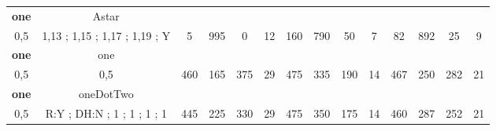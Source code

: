 \begin{table}[H]
{\begin{tabular}{|c|c|c|c|c|c|c|c|c|c|c|c|c|c|}
\cellcolor{blue!15}\textbf{one} & Astar& {\color[HTML]{00009B} } & {\color[HTML]{9A0000} } & {\color[HTML]{009901} } &  & {\color[HTML]{00009B} } & {\color[HTML]{9A0000} } & {\color[HTML]{009901} } &  & {\color[HTML]{00009B} } & {\color[HTML]{9A0000} } & {\color[HTML]{009901} } &  \\ 
\cellcolor{ blue!15}0,5 & 1,13 ; 1,15 ; 1,17 ; 1,19 ; Y & \multirow{-2}{*}{{\color[HTML]{00009B} 5}} & \multirow{-2}{*}{{\color[HTML]{9A0000} 995}} & \multirow{-2}{*}{{\color[HTML]{009901} 0}} & \multirow{-2}{*}{12} & \multirow{-2}{*}{{\color[HTML]{00009B} 160}} & \multirow{-2}{*}{{\color[HTML]{9A0000} 790}} & \multirow{-2}{*}{{\color[HTML]{009901} 50}} & \multirow{-2}{*}{7} & \multirow{-2}{*}{{\color[HTML]{00009B} 82}} & \multirow{-2}{*}{{\color[HTML]{9A0000} 892}} & \multirow{-2}{*}{{\color[HTML]{009901} 25}} & \multirow{-2}{*}{9} \\ \hline

\cellcolor{blue!15}\textbf{one} & one& {\color[HTML]{00009B} } & {\color[HTML]{9A0000} } & {\color[HTML]{009901} } &  & {\color[HTML]{00009B} } & {\color[HTML]{9A0000} } & {\color[HTML]{009901} } &  & {\color[HTML]{00009B} } & {\color[HTML]{9A0000} } & {\color[HTML]{009901} } &  \\ 
\cellcolor{ blue!15}0,5 & 0,5 & \multirow{-2}{*}{{\color[HTML]{00009B} 460}} & \multirow{-2}{*}{{\color[HTML]{9A0000} 165}} & \multirow{-2}{*}{{\color[HTML]{009901} 375}} & \multirow{-2}{*}{29} & \multirow{-2}{*}{{\color[HTML]{00009B} 475}} & \multirow{-2}{*}{{\color[HTML]{9A0000} 335}} & \multirow{-2}{*}{{\color[HTML]{009901} 190}} & \multirow{-2}{*}{14} & \multirow{-2}{*}{{\color[HTML]{00009B} 467}} & \multirow{-2}{*}{{\color[HTML]{9A0000} 250}} & \multirow{-2}{*}{{\color[HTML]{009901} 282}} & \multirow{-2}{*}{21} \\ \hline

\cellcolor{blue!15}\textbf{one} & oneDotTwo& {\color[HTML]{00009B} } & {\color[HTML]{9A0000} } & {\color[HTML]{009901} } &  & {\color[HTML]{00009B} } & {\color[HTML]{9A0000} } & {\color[HTML]{009901} } &  & {\color[HTML]{00009B} } & {\color[HTML]{9A0000} } & {\color[HTML]{009901} } &  \\ 
\cellcolor{ blue!15}0,5 & R:Y ; DH:N ; 1 ; 1 ; 1 ; 1 & \multirow{-2}{*}{{\color[HTML]{00009B} 445}} & \multirow{-2}{*}{{\color[HTML]{9A0000} 225}} & \multirow{-2}{*}{{\color[HTML]{009901} 330}} & \multirow{-2}{*}{29} & \multirow{-2}{*}{{\color[HTML]{00009B} 475}} & \multirow{-2}{*}{{\color[HTML]{9A0000} 350}} & \multirow{-2}{*}{{\color[HTML]{009901} 175}} & \multirow{-2}{*}{14} & \multirow{-2}{*}{{\color[HTML]{00009B} 460}} & \multirow{-2}{*}{{\color[HTML]{9A0000} 287}} & \multirow{-2}{*}{{\color[HTML]{009901} 252}} & \multirow{-2}{*}{21} \\ \hline


\end{tabular}}
\end{table}
